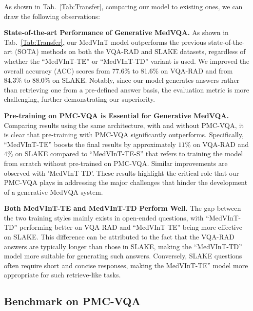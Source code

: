 \documentclass{article}
\begin{document}
As shown in Tab.~\ref{Tab:Transfer}, comparing our model to existing ones, 
we can draw the following observations: 

\noindent \textbf{State-of-the-art Performance of Generative MedVQA.}
As shown in Tab.~\ref{Tab:Transfer}, our MedVInT model outperforms the previous state-of-the-art (SOTA) methods on both the VQA-RAD and SLAKE datasets, regardless of whether the ``MedVInT-TE'' or ``MedVInT-TD'' variant is used. We improved the overall accuracy (ACC) scores from 77.6\% to 81.6\% on VQA-RAD and from 84.3\% to 88.0\% on SLAKE. Notably, since our model generates answers rather than retrieving one from a pre-defined answer basis, the evaluation metric is more challenging, further demonstrating our superiority.

\noindent \textbf{Pre-training on PMC-VQA is Essential for Generative MedVQA.} 
Comparing results using the same architecture, with and without PMC-VQA, it is clear that pre-training with PMC-VQA significantly outperforms. Specifically, ``MedVInT-TE'' boosts the final results by approximately $11\%$ on VQA-RAD and $4\%$ on SLAKE compared to ``MedVInT-TE-S'' that refers to training the model from scratch without pre-trained on PMC-VQA. Similar improvements are observed with 'MedVInT-TD'. 
These results highlight the critical role that our PMC-VQA plays in addressing the major challenges that hinder the development of a generative MedVQA system.

\noindent \textbf{Both MedVInT-TE and MedVInT-TD Perform Well.} The gap between the two training styles mainly exists in open-ended questions, with ``MedVInT-TD'' performing better on VQA-RAD and ``MedVInT-TE'' being more effective on SLAKE. This difference can be attributed to the fact that the VQA-RAD answers are typically longer than those in SLAKE, making the ``MedVInT-TD'' model more suitable for generating such answers. Conversely, SLAKE questions often require short and concise responses, making the MedVInT-TE'' model more appropriate for such retrieve-like tasks.

\subsection{Benchmark on PMC-VQA}
\label{sec:pmc-vqa-results}
\end{document}
